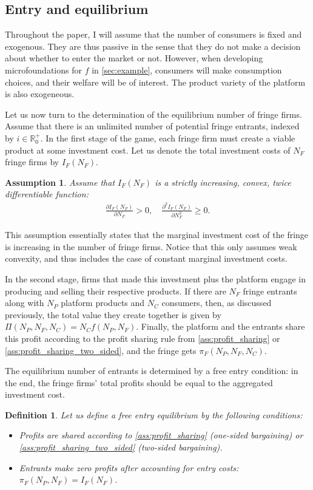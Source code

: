 \documentclass[a4paper]{article}
\newtheorem{definition}{Definition}
\newtheorem{assumption}{Assumption}
\begin{document}
\subsection{Entry and equilibrium}

Throughout the paper, I will assume that the number of consumers is fixed and exogenous.
They are thus passive in the sense that they do not make a decision about whether to enter the market or not.
However, when developing microfoundations for $f$ in \cref{sec:example}, consumers will make consumption choices, and their welfare will be of interest.
The product variety of the platform is also exogeneous.

Let us now turn to the determination of the equilibrium number of fringe firms.
Assume that there is an unlimited number of potential fringe entrants, indexed by $i \in \mathbb{R}^+_0$.
In the first stage of the game, each fringe firm must create a viable product at some investment cost.
Let us denote the total investment costs of $N_F$ fringe firms by $I_F(N_F)$.
\begin{assumption}
    Assume that $I_F(N_F)$ is a strictly increasing, convex, twice differentiable function:
    \begin{align*}
        \frac{\partial I_F(N_F)}{\partial N_F} > 0, \quad \frac{\partial^2 I_F(N_F)}{\partial N_F^2} \geq 0.
    \end{align*}
\end{assumption}
This assumption essentially states that the marginal investment cost of the fringe is increasing in the number of fringe firms.
Notice that this only assumes weak convexity, and thus includes the case of constant marginal investment costs.

In the second stage, firms that made this investment plus the platform engage in producing and selling their respective products.
If there are $N_F$ fringe entrants along with $N_P$ platform products and $N_C$ consumers, then, as discussed previously, the total value they create together is given by $\Pi(N_P, N_F, N_C) = N_C f(N_P, N_F)$.
Finally, the platform and the entrants share this profit according to the profit sharing rule from \cref{ass:profit_sharing} or \cref{ass:profit_sharing_two_sided}, and the fringe gets $\pi_F(N_P, N_F, N_C)$.

The equilibrium number of entrants is determined by a free entry condition: in the end, the fringe firms' total profits should be equal to the aggregated investment cost.
\begin{definition}
    \label{ass:free_entry}
    Let us define a free entry equilibrium by the following conditions:
    \begin{itemize}
        \item Profits are shared according to \cref{ass:profit_sharing} (one-sided bargaining) or \cref{ass:profit_sharing_two_sided} (two-sided bargaining).
        \item Entrants make zero profits after accounting for entry costs: $\pi_F(N_P, N_F) = I_F(N_F)$.
    \end{itemize}
\end{definition}
\end{document}
